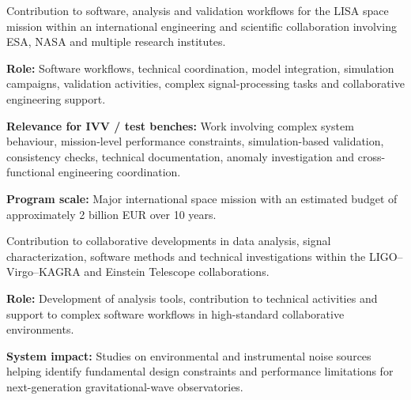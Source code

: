 \documentclass[8pt,a4paper,ragged2e,withhyper]{altacv}
\begin{document}


Contribution to software, analysis and validation workflows for the LISA space mission within an international engineering and scientific collaboration involving ESA, NASA and multiple research institutes.

\textbf{Role:} Software workflows, technical coordination, model integration, simulation campaigns, validation activities, complex signal-processing tasks and collaborative engineering support.

\textbf{Relevance for IVV / test benches:} Work involving complex system behaviour, mission-level performance constraints, simulation-based validation, consistency checks, technical documentation, anomaly investigation and cross-functional engineering coordination.

\textbf{Program scale:} Major international space mission with an estimated budget of approximately 2 billion EUR over 10 years.

\divider


Contribution to collaborative developments in data analysis, signal characterization, software methods and technical investigations within the LIGO--Virgo--KAGRA and Einstein Telescope collaborations.

\textbf{Role:} Development of analysis tools, contribution to technical activities and support to complex software workflows in high-standard collaborative environments.

\textbf{System impact:} Studies on environmental and instrumental noise sources helping identify fundamental design constraints and performance limitations for next-generation gravitational-wave observatories.


\vspace{-.3cm}


{\small
{}
}
\end{document}
